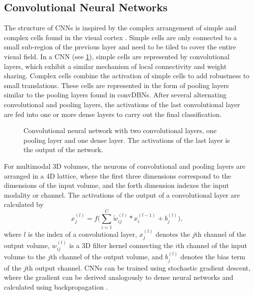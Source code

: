 \subsection{Convolutional Neural Networks}

The structure of CNNs is inspired by the complex arrangement of simple and
complex cells found in the visual cortex \citep{hubel1962,hubel1968}. Simple
cells are only connected to a small sub-region of the previous layer and need to
be tiled to cover the entire visual field. In a CNN (see \ref{fig:cnn}),
simple cells are represented by convolutional layers, which exhibit a similar mechanism of local
connectivity and weight sharing. Complex cells combine the activation of simple
cells to add robustness to small translations. These cells are represented in
the form of pooling layers similar to the pooling layers found in convDBNs.
After several alternating convolutional and pooling layers, the activations of
the last convolutional layer are fed into one or more dense layers to
carry out the final classification.

\begin{figure}
\centering

\caption[Schematic illustration of a CNN]{Convolutional neural network with two
convolutional layers, one pooling layer and one dense layer. The activations of the last layer is the output of
the network.}
\label{fig:cnn}
\end{figure}

For multimodal 3D volumes, the neurons of convolutional and pooling layers are
arranged in a 4D lattice, where the first three dimensions correspond to the
dimensions of the input volume, and the forth dimension indexes
the input modality or channel. The activations of the output of a
convolutional layer are calculated by
\begin{equation}
x^{(l)}_j = f\Bigg(\sum_{i=1}^C\tilde{w}^{(l)}_{ij}*x^{(l-1)}_i
+ b^{(l)}_j\Bigg),
\end{equation}
where $l$ is the index of a convolutional layer, $x^{(l)}_j$ denotes the
$j$th channel of the output volume, $w^{(l)}_{ij}$ is a 3D filter
kernel connecting the $i$th channel of the input volume to the $j$th channel
of the output volume, and $b_j^{(l)}$ denotes the bias term of the $j$th output
channel. CNNs can be trained using stochastic gradient descent, where the
gradient can be derived analogously to dense neural networks and calculated using
backpropagation \citep{lecun1989,LeCun1998}. 

